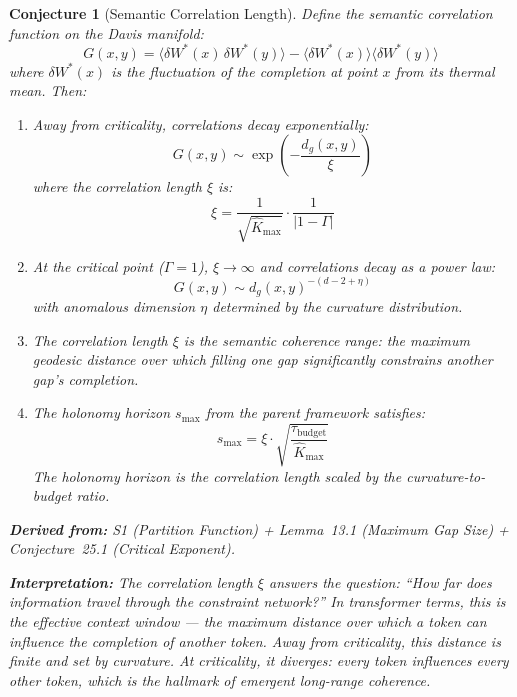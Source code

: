 \documentclass[11pt,letterpaper]{article}
\newtheorem{conjecture}{Conjecture}[section]
\newcommand{\Khat}{\hat{K}}
\newcommand{\tbudget}{\tau_{\mathrm{budget}}}
\newcommand{\smax}{s_{\mathrm{max}}}
\newcommand{\dg}{d_g}
\begin{document}
\begin{conjecture}[Semantic Correlation Length]\label{conj:correlation}
Define the \emph{semantic correlation function} on the Davis manifold:
\begin{equation}\label{eq:correlation}
    G(x, y) = \langle \delta W^*(x) \, \delta W^*(y) \rangle 
    - \langle \delta W^*(x) \rangle \langle \delta W^*(y) \rangle
\end{equation}
where $\delta W^*(x)$ is the fluctuation of the completion at point $x$ 
from its thermal mean. Then:

\begin{enumerate}[label=(\alph*)]
    \item Away from criticality, correlations decay exponentially:
    \begin{equation}\label{eq:correlation_decay}
        G(x, y) \sim \exp\left(-\frac{\dg(x, y)}{\xi}\right)
    \end{equation}
    where the \emph{correlation length} $\xi$ is:
    \begin{equation}\label{eq:correlation_length}
        \xi = \frac{1}{\sqrt{\Khat_{\max}}} 
        \cdot \frac{1}{|1 - \Gamma|}
    \end{equation}
    
    \item At the critical point ($\Gamma = 1$), $\xi \to \infty$ and 
    correlations decay as a power law:
    \begin{equation}\label{eq:critical_correlation}
        G(x, y) \sim \dg(x, y)^{-(d-2+\eta)}
    \end{equation}
    with anomalous dimension $\eta$ determined by the curvature 
    distribution.
    
    \item The correlation length $\xi$ is the \emph{semantic coherence 
    range}: the maximum geodesic distance over which filling one gap 
    significantly constrains another gap's completion.
    
    \item The holonomy horizon $\smax$ from the parent framework satisfies:
    \begin{equation}\label{eq:horizon_correlation}
        \smax = \xi \cdot \sqrt{\frac{\tbudget}{\Khat_{\max}}}
    \end{equation}
    The holonomy horizon is the correlation length scaled by the 
    curvature-to-budget ratio.
\end{enumerate}

\textbf{Derived from:} S1 (Partition Function) + Lemma~13.1 
(Maximum Gap Size) + Conjecture~25.1 (Critical Exponent).

\textbf{Interpretation:} The correlation length $\xi$ answers the 
question: ``How far does information travel through the constraint 
network?'' In transformer terms, this is the effective context window --- 
the maximum distance over which a token can influence the completion of 
another token. Away from criticality, this distance is finite and set by 
curvature. At criticality, it diverges: every token influences every other 
token, which is the hallmark of emergent long-range coherence.
\end{conjecture}
\end{document}
